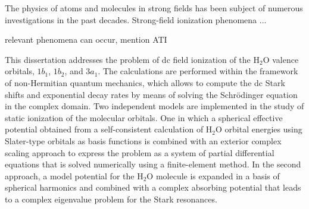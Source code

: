 



The physics of atoms and molecules in strong fields has been subject
of numerous investigations in the past decades. Strong-field
ionization phenomena ...


relevant phenomena can occur, mention ATI





This dissertation addresses the problem of dc field ionization of the
H$_{2}$O valence orbitals, $1b_{1}$, $1b_{2}$, and $3a_{1}$. The
calculations are performed within the framework of non-Hermitian
quantum mechanics, which allows to compute the dc Stark shifts and
exponential decay rates by means of solving the Schr\"{o}dinger
equation in the complex domain. Two independent models are implemented
in the study of static ionization of the molecular orbitals. One in
which a spherical effective potential obtained from a self-consistent
calculation of H$_{2}$O orbital energies using Slater-type orbitals as
basis functions is combined with an exterior complex scaling approach
to express the problem as a system of partial differential equations
that is solved numerically using a finite-element method. In the
second approach, a model potential for the H$_{2}$O molecule is
expanded in a basis of spherical harmonics and combined with a complex
absorbing potential that leads to a complex eigenvalue problem for the
Stark resonances.

